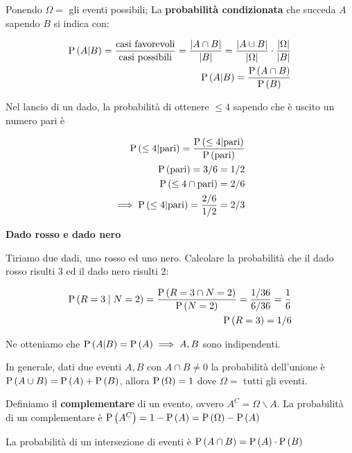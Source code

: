 \begin{defn}
	
	Ponendo $ \Omega = $ gli eventi possibili;
	La \textbf{probabilità condizionata} che succeda $ A $ sapendo $ B $ si indica con:
	
	\begin{equation}
	\begin{aligned}
	\text{P}\left(A|B\right) = \dfrac{\text{casi favorevoli}}{\text{casi possibili}} = \dfrac{\lvert A \cap B\rvert}{\lvert B\rvert} = \dfrac{\lvert A \cup B\rvert}{\lvert\Omega\rvert} \cdot \dfrac{\lvert\Omega\rvert}{\lvert B\rvert} \\
	\text{P}\left(A|B\right) = \dfrac{\text{P}\left(A \cap B\right)}{\text{P}\left(B\right)}	
	\end{aligned}
	\end{equation}
	
\end{defn}

\begin{exmp}
	Nel lancio di un dado, la probabilità di ottenere $ \leq 4 $ sapendo che è uscito un numero pari è
	
	\begin{equation*}
		\begin{aligned}
			\text{P}\left(\leq 4|\text{pari}\right) = \dfrac{\text{P}\left(\leq 4 | \text{pari}\right)}{\text{P}\left(\text{pari}\right)} \\
			\text{P}\left(\text{pari}\right) = 3/6 = 1/2 \\
			\text{P}\left(\leq 4 \cap \text{pari}\right) = 2/6 \\
			\implies \text{P}\left(\leq 4|\text{pari}\right) = \dfrac{2/6}{1/2} = 2/3
		\end{aligned}
	\end{equation*}
\end{exmp}
 
 
\begin{exrc}
	\textbf{Dado rosso e dado nero}
	
	Tiriamo due dadi, uno rosso ed uno nero. Calcolare la probabilità che il dado rosso risulti 3 ed il dado nero risulti 2:
	
	\begin{equation*}
		\begin{aligned}
			\text{P}\left(R=3 \mid N=2\right) = \dfrac{\text{P}\left(R=3 \cap N=2\right)}{\text{P}\left(N=2\right)} = 	\dfrac{1/36}{6/36} = \dfrac{1}{6} \\
			\text{P}\left(R=3\right) = 1/6
		\end{aligned}
	\end{equation*}
	
	Ne otteniamo che $ \text{P}\left(A|B\right) = \text{P}\left(A\right) \implies A, B $ sono indipendenti.
	
	In generale, dati due eventi $ A, B $ con $ A \cap B \neq 0 $ la probabilità dell'unione è $ \text{P}\left(A \cup B\right) = \text{P}\left(A\right) + \text{P}\left(B\right) $, allora $ \text{P}\left(\Omega\right) = 1 $ dove $ \Omega = $ tutti gli eventi.
\end{exrc}

\begin{defn}
	Definiamo il \textbf{complementare} di un evento, ovvero $ A^C=\Omega \backslash A $. La probabilità di un complementare è $ \text{P}\left(A^C\right) = 1 - \text{P}\left(A\right) = \text{P}\left(\Omega\right) - \text{P}\left(A\right) $
	
	La probabilità di un intersezione di eventi è $ \text{P}\left(A \cap B\right) = \text{P}\left(A\right) \cdot \text{P}\left(B\right) $
\end{defn}